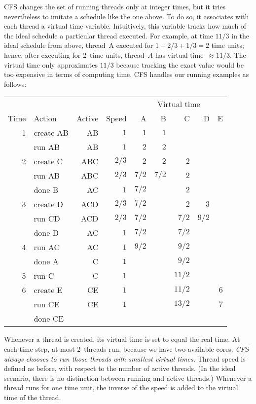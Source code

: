 CFS changes the set of running threads only at integer times,
  but it tries nevertheless to imitate a schedule like the one above.
To do so, it associates with each thread a virtual time variable.
Intuitively,
  this variable tracks how much of the ideal schedule a particular thread executed.
For example,
  at time $11/3$ in the ideal schedule from above,
  thread~A executed for $1+2/3+1/3=2$ time units;
  hence, after executing for $2$~time units,
  thread~$A$ has virtual time~$\approx11/3$.
The virtual time only approximates $11/3$
  because tracking the exact value would be too expensive in terms of computing time.
CFS handles our running examples as follows:
\begin{center}
\begin{tabular}{@{}rlrrrrrrr@{}}
\toprule
  & & & & \multicolumn{5}{c}{Virtual time} \\
Time & Action & Active & Speed & A & B & C & D & E \\
\midrule
1 & create AB & AB    & $1$   & $1$ & $1$ \\
  & run AB    & AB    & $1$   & $2$ & $2$ \\
2 & create C  & ABC   & $2/3$ & $2$ & $2$ & $2$ \\
  & run AB    & ABC   & $2/3$ & $7/2$ & $7/2$ & $2$ \\
  & done B    & AC    & $1$   & $7/2$ & & $2$ \\
3 & create D  & ACD   & $2/3$ & $7/2$ & & $2$ & $3$ \\
  & run CD    & ACD   & $2/3$ & $7/2$ & & $7/2$ & $9/2$ \\
  & done D    & AC    & $1$   & $7/2$ & & $7/2$ \\
4 & run AC    & AC    & $1$   & $9/2$ & & $9/2$ \\
  & done A    & C     & $1$   & & & $9/2$ \\
5 & run C     & C     & $1$   & & & $11/2$ \\
6 & create E  & CE    & $1$   & & & $11/2$ & & $6$ \\
  & run CE    & CE    & $1$   & & & $13/2$ & & $7$ \\
  & done CE   \\
\bottomrule
\end{tabular}
\end{center}
Whenever a thread is created, its virtual time is set to equal the real time.
At each time step, at most $2$~threads run, because we have two available cores.
\emph{CFS always chooses to run those threads with smallest virtual times.}
Thread speed is defined as before,
  with respect to the number of active threads.
(In the ideal scenario, there is no distinction between running and active threads.)
Whenever a thread runs for one time unit,
  the inverse of the speed is added to the virtual time of the thread.

